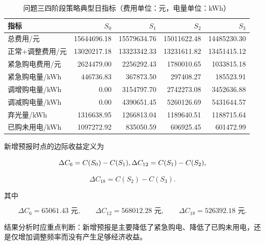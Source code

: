 \begin{table}[H]
\centering
{}
\begin{tabular}{lrrrr}
\toprule
指标 & \(S_0\) & \(S_1\) & \(S_2\) & \(S_3\) \\
\midrule
总费用/元 & 15644696.18 & 15579634.76 & 15011622.48 & 14485230.30 \\
正常+调整费用/元 & 13020217.18 & 13323342.33 & 13231611.82 & 13451415.12 \\
紧急购电费用/元 & 2624479.00 & 2256292.43 & 1780010.65 & 1033815.18 \\
紧急购电量/kWh & 446736.83 & 367873.50 & 297408.27 & 185523.91 \\
调增购电量/kWh & 0.00 & 3154797.70 & 2742273.08 & 3452636.88 \\
调减购电量/kWh & 0.00 & 4390651.45 & 5260126.69 & 5431644.57 \\
弃光量/kWh & 1316638.95 & 1266813.04 & 1189640.51 & 1188715.64 \\
已购未用电/kWh & 1097272.92 & 835050.59 & 606925.45 & 601472.99 \\
\bottomrule
\end{tabular}
\caption{问题三四阶段策略典型日指标（费用单位：元，电量单位：kWh）}
\label{tab:8}
\end{table}

新增预报时点的边际收益定义为

\[
\Delta C_6=C(S_0)-C(S_1),\\
\Delta C_{12}=C(S_1)-C(S_2),
\]

\begin{equation}
\Delta C_{18}=C(S_2)-C(S_3).
\end{equation}

其中

\[
\Delta C_6=\text{65061.43 元},
\qquad
\Delta C_{12}=\text{568012.28 元},
\qquad
\Delta C_{18}=\text{526392.18 元}.
\]

结果分析时应重点判断：新增预报是主要降低了紧急购电、降低了已购未用电，还是仅增加调整频率而没有产生足够经济收益。

\begin{table}[H]
\centering
{}
\caption{问题三指定日期分阶段电量与费用（电量单位：kWh，费用单位：元）}
\label{tab:9}
\end{table}

